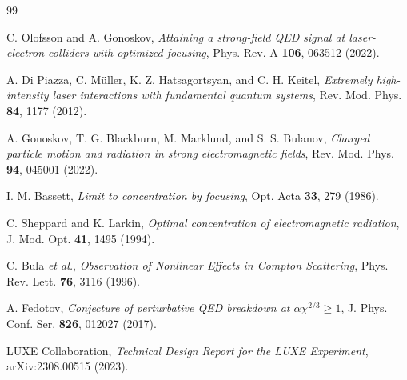 \documentclass[twocolumn, 12pt]{article}
\begin{document}
\begin{thebibliography}{99}

C. Olofsson and A. Gonoskov, \textit{Attaining a strong-field QED signal at laser-electron colliders with optimized focusing}, Phys. Rev. A \textbf{106}, 063512 (2022).

A. Di Piazza, C. Müller, K. Z. Hatsagortsyan, and C. H. Keitel, \textit{Extremely high-intensity laser interactions with fundamental quantum systems}, Rev. Mod. Phys. \textbf{84}, 1177 (2012).

A. Gonoskov, T. G. Blackburn, M. Marklund, and S. S. Bulanov, \textit{Charged particle motion and radiation in strong electromagnetic fields}, Rev. Mod. Phys. \textbf{94}, 045001 (2022).

I. M. Bassett, \textit{Limit to concentration by focusing}, Opt. Acta \textbf{33}, 279 (1986).

C. Sheppard and K. Larkin, \textit{Optimal concentration of electromagnetic radiation}, J. Mod. Opt. \textbf{41}, 1495 (1994).

C. Bula \textit{et al.}, \textit{Observation of Nonlinear Effects in Compton Scattering}, Phys. Rev. Lett. \textbf{76}, 3116 (1996).

A. Fedotov, \textit{Conjecture of perturbative QED breakdown at $\alpha\chi^{2/3}\ge 1$}, J. Phys. Conf. Ser. \textbf{826}, 012027 (2017).

LUXE Collaboration, \textit{Technical Design Report for the LUXE Experiment}, arXiv:2308.00515 (2023).

\end{thebibliography}
\end{document}

